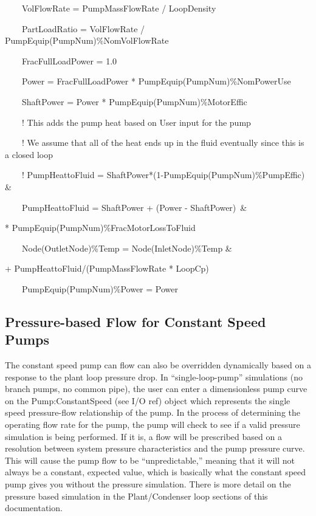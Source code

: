 ~~~~VolFlowRate = PumpMassFlowRate / LoopDensity

~~~~PartLoadRatio = VolFlowRate / PumpEquip(PumpNum)\%NomVolFlowRate

~~~~FracFullLoadPower = 1.0

~~~~Power = FracFullLoadPower * PumpEquip(PumpNum)\%NomPowerUse

~~~~ShaftPower = Power * PumpEquip(PumpNum)\%MotorEffic

~~~~! This adds the pump heat based on User input for the pump

~~~~! We assume that all of the heat ends up in the fluid eventually since this is a closed loop

~~~~! PumpHeattoFluid = ShaftPower*(1-PumpEquip(PumpNum)\%PumpEffic)~ \&

~~~~PumpHeattoFluid = ShaftPower + (Power - ShaftPower)~\& \par
\hspace{5cm} * PumpEquip(PumpNum)\%FracMotorLossToFluid

~~~~Node(OutletNode)\%Temp = Node(InletNode)\%Temp \& \par
\hspace{6cm} + PumpHeattoFluid/(PumpMassFlowRate * LoopCp)

~~~~PumpEquip(PumpNum)\%Power = Power

\subsection{Pressure-based Flow for Constant Speed Pumps}\label{pressure-based-flow-for-constant-speed-pumps}

The constant speed pump can flow can also be overridden dynamically based on a response to the plant loop pressure drop. In ``single-loop-pump'' simulations (no branch pumps, no common pipe), the user can enter a dimensionless pump curve on the Pump:ConstantSpeed (see I/O ref) object which represents the single speed pressure-flow relationship of the pump. In the process of determining the operating flow rate for the pump, the pump will check to see if a valid pressure simulation is being performed. If it is, a flow will be prescribed based on a resolution between system pressure characteristics and the pump pressure curve. This will cause the pump flow to be ``unpredictable,'' meaning that it will not always be a constant, expected value, which is basically what the constant speed pump gives you without the pressure simulation. There is more detail on the pressure based simulation in the Plant/Condenser loop sections of this documentation.

